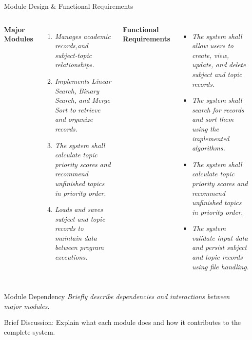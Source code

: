 \documentclass[aspectratio=169,11pt]{beamer}
\newcommand{\smallnote}[1]{%
\vspace{0.08cm}
{\scriptsize\color{GEUGrey}#1}
}
\newcommand{\placeholder}[1]{%
\textit{\color{GEUGrey}#1}
}
\begin{document}
\begin{frame}{Module Design \& Functional Requirements}

\begin{columns}[T,totalwidth=\textwidth]

\vspace{-0.7cm}
\textbf{\color{GEUBlue}Major Modules}

\begin{enumerate}\itemsep3pt
\item \placeholder{Manages academic records,and subject-topic relationships.}
\item \placeholder{Implements Linear Search, Binary Search, and Merge Sort to retrieve and organize records.}
\item \placeholder{The system shall calculate topic priority scores and recommend unfinished topics in priority order.}
\item \placeholder{Loads and saves subject and topic records to maintain data between program executions.}
\end{enumerate}

\vspace{-0.7cm}


\textbf{\color{GEUBlue}Functional Requirements}

\begin{itemize}\itemsep3pt
\item \placeholder{The system shall allow users to create, view, update, and delete subject and topic records.}
\item \placeholder{The system shall search for records and sort them using the implemented algorithms.}
\item \placeholder{The system shall calculate topic priority scores and recommend unfinished topics in priority order.}
\item \placeholder{The system validate input data and persist subject and topic records using file handling.}
\end{itemize}

\end{columns}

\vfill

\begin{block}{Module Dependency}
\placeholder{
Briefly describe dependencies and interactions between major modules.
}
\end{block}

\smallnote{
Brief Discussion: Explain what each module does and how it contributes
to the complete system.
}

\end{frame}
\end{document}
